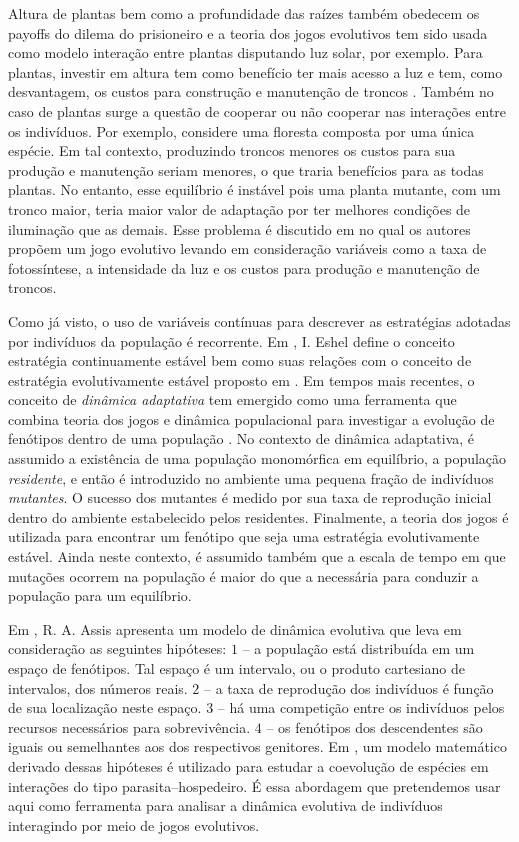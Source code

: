 \documentclass[
	12pt,				%
	openany,			%
	oneoside,			%
	a4paper,			%
	english,			%
	spanish,			%
	brazil,				%
	]{abntex2}
\begin{document}
Altura de plantas bem como a profundidade das raízes também obedecem os payoffs do dilema do prisioneiro \cite{easley2010} e a teoria dos jogos evolutivos tem sido usada como modelo interação entre plantas disputando luz solar, por exemplo. Para plantas, investir em altura tem como benefício ter mais acesso a luz e tem, como desvantagem, os custos para construção e manutenção de troncos \cite{Falster2003337}. Também no caso de plantas surge a questão de cooperar ou não cooperar nas interações entre os indivíduos. Por exemplo, considere uma floresta composta por uma única espécie. Em tal contexto, produzindo troncos menores os custos para sua produção e manutenção seriam menores, o que traria benefícios para as todas plantas. No entanto, esse equilíbrio é instável pois uma planta mutante, com um tronco maior, teria maior valor de adaptação por ter melhores condições de iluminação que as demais. Esse problema é discutido em \cite{Iwasa1985279} no qual os autores propõem um jogo evolutivo levando em consideração variáveis como a taxa de fotossíntese, a intensidade da luz e os custos para produção e manutenção de troncos.        

Como já visto, o uso de variáveis contínuas para descrever as estratégias adotadas por indivíduos da população é recorrente. Em \cite{Eshel198399}, I. Eshel define o conceito estratégia continuamente estável bem como suas relações com o conceito de estratégia evolutivamente estável proposto em \cite{MaynardSmith1974209}. Em tempos mais recentes, o conceito de \textit{dinâmica adaptativa} tem emergido como uma ferramenta que combina teoria dos jogos e dinâmica populacional para investigar a evolução de fenótipos dentro de uma população \cite{DINADPT,CONTRA}. No contexto de dinâmica adaptativa, é assumido a existência de uma população monomórfica em equilíbrio, a população \textit{residente}, e então é introduzido no ambiente uma pequena fração de indivíduos \textit{mutantes}. O sucesso dos mutantes é medido por sua taxa de reprodução inicial dentro do ambiente estabelecido pelos residentes. Finalmente, a teoria dos jogos é utilizada para encontrar um fenótipo que seja uma estratégia evolutivamente estável. Ainda neste contexto, é assumido também que a escala de tempo em que mutações ocorrem na população é maior do que a necessária para conduzir a população para um equilíbrio.     

Em \cite{RAAT}, R. A. Assis apresenta um modelo de dinâmica evolutiva que leva em consideração as seguintes hipóteses: $1$ -- a população está distribuída em um espaço de fenótipos. Tal espaço é um intervalo, ou o produto cartesiano de intervalos, dos números reais. $2$ -- a taxa de reprodução dos indivíduos é função de sua localização neste espaço. $3$ -- há uma competição entre os indivíduos pelos recursos necessários para sobrevivência. $4$ -- os fenótipos dos descendentes são iguais ou semelhantes aos dos respectivos genitores. Em \cite{Assis20121507}, um modelo matemático derivado dessas hipóteses é utilizado para estudar a coevolução de espécies em interações do tipo parasita--hospedeiro. É essa abordagem que pretendemos usar aqui como ferramenta para analisar a dinâmica evolutiva de indivíduos interagindo por meio de jogos evolutivos.
\end{document}
